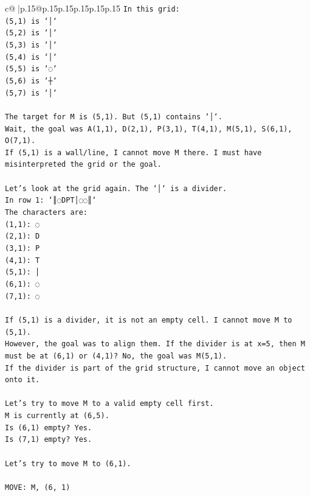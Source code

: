 \documentclass{article}
\begin{document}
{\begin{supertabular}{c@{$\;$}|p{.15\linewidth}@{}p{.15\linewidth}p{.15\linewidth}p{.15\linewidth}p{.15\linewidth}p{.15\linewidth}}
{{{\texttt{In this grid:} \\
\texttt{(5,1) is `│`} \\
\texttt{(5,2) is `│`} \\
\texttt{(5,3) is `│`} \\
\texttt{(5,4) is `│`} \\
\texttt{(5,5) is `◌`} \\
\texttt{(5,6) is `┼`} \\
\texttt{(5,7) is `│`} \\
\\ 
\texttt{The target for M is (5,1). But (5,1) contains `│`.} \\
\texttt{Wait, the goal was A(1,1), D(2,1), P(3,1), T(4,1), M(5,1), S(6,1), O(7,1).} \\
\texttt{If (5,1) is a wall/line, I cannot move M there. I must have misinterpreted the grid or the goal.} \\
\\ 
\texttt{Let's look at the grid again. The `│` is a divider.} \\
\texttt{In row 1: `║◌DPT│◌◌║`} \\
\texttt{The characters are:} \\
\texttt{(1,1): ◌} \\
\texttt{(2,1): D} \\
\texttt{(3,1): P} \\
\texttt{(4,1): T} \\
\texttt{(5,1): │} \\
\texttt{(6,1): ◌} \\
\texttt{(7,1): ◌} \\
\\ 
\texttt{If (5,1) is a divider, it is not an empty cell. I cannot move M to (5,1).} \\
\texttt{However, the goal was to align them. If the divider is at x=5, then M must be at (6,1) or (4,1)? No, the goal was M(5,1).} \\
\texttt{If the divider is part of the grid structure, I cannot move an object onto it.} \\
\\ 
\texttt{Let's try to move M to a valid empty cell first.} \\
\texttt{M is currently at (6,5).} \\
\texttt{Is (6,1) empty? Yes.} \\
\texttt{Is (7,1) empty? Yes.} \\
\\ 
\texttt{Let's try to move M to (6,1).} \\
\\ 
\texttt{MOVE: M, (6, 1)} \\
            }
        }
    }
     \\ \\


\end{supertabular}}
\end{document}
